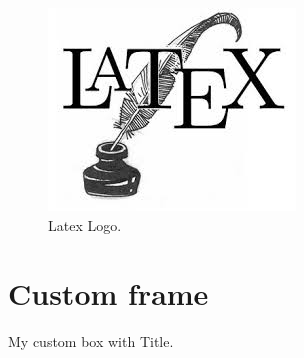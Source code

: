 \documentclass[a4paper, oneside, 12pt, parskip=half]{scrbook}
\begin{document}
\begin{figure}
\includegraphics[width=\textwidth]{latex.jpeg}
  \caption{Latex Logo.}
  \label{fig:Latex}
\end{figure}

\newpage
\section{Custom frame}

\begin{custombox}
My custom box with Title.
\end{custombox}
\end{document}

